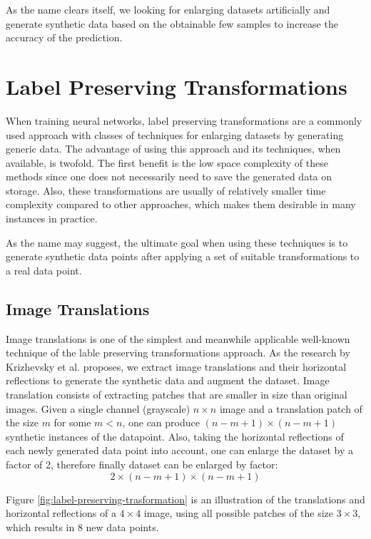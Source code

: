 As the name clears itself, we looking for enlarging datasets artificially and generate synthetic
data based on the obtainable few samples to increase the accuracy of the prediction.

\section{Label Preserving Transformations}
\label{tit:label-preserving}
When training neural networks, label preserving transformations are a commonly used approach with classes of
techniques for enlarging datasets by generating generic data. The advantage of using this approach
and its techniques, when available, is twofold. The first benefit is the low space complexity of these
methods since one does not necessarily need to save the generated data on storage. Also, these
transformations are usually of relatively smaller time complexity compared to other approaches,
which makes them desirable in many instances in practice.

As the name may suggest, the ultimate goal when using these techniques is to generate synthetic data points after applying a set of suitable transformations to a real data point.

\subsection{Image Translations}
Image translations is one of the simplest and meanwhile applicable well-known technique of the lable
preserving transformations approach. As the research by Krizhevsky et al.
\cite{image_translation_paper} proposes, we extract
image translations and their horizontal reflections to generate the synthetic data and augment the
dataset. Image translation consists of extracting patches that are smaller in size than original
images. Given a single channel (grayscale) $n \times n$ image and a translation patch of the size
$m$ for some $m<n$, one can produce $(n-m+1) \times (n-m+1) $ synthetic instances of the datapoint. Also, taking
the horizontal reflections of each newly generated data point into account, one can enlarge the
dataset by a factor of 2, therefore finally dataset can be enlarged by factor: $$2\times(n-m+1)\times(n-m+1)$$

Figure \ref{fig:label-preserving-trasformation} is an illustration of the translations and horizontal
reflections of a $4 \times 4$ image, using all
possible patches of the size $3 \times 3$, which results in $8$ new data points.

